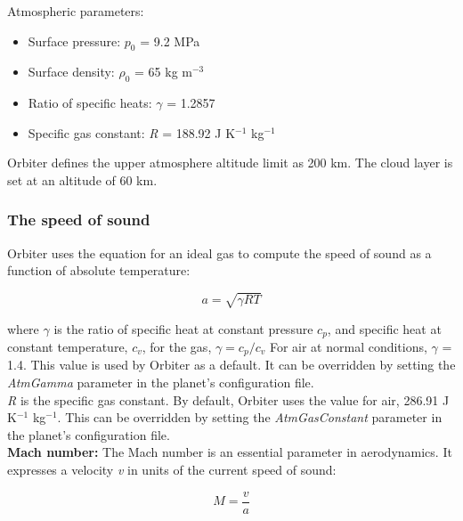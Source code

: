 \documentclass[Orbiter Developer Manual.tex]{subfiles}
\begin{document}
\noindent
Atmospheric parameters:

\begin{itemize}
\item Surface pressure: $p_{0}$ = 9.2 MPa
\item Surface density: $\rho_{0}$ = 65 kg m$^{-3}$
\item Ratio of specific heats: $\gamma$ = 1.2857
\item Specific gas constant: \textit{R} = 188.92 J K$^{-1}$ kg$^{-1}$
\end{itemize}

\noindent
Orbiter defines the upper atmosphere altitude limit as 200 km. The cloud layer is set at an altitude of 60 km.


\subsubsection{The speed of sound}
Orbiter uses the equation for an ideal gas to compute the speed of sound as a function of absolute temperature:

\[ a = \sqrt{\gamma RT} \]

\noindent
where $\gamma$ is the ratio of specific heat at constant pressure $c_{p}$, and specific heat at constant temperature, $c_{v}$, for the gas, $\gamma = c_{p} / c_{v}$ For air at normal conditions, $\gamma$ = 1.4. This value is used by Orbiter as a default. It can be overridden by setting the \textit{AtmGamma} parameter in the planet's configuration file.\\
\textit{R} is the specific gas constant. By default, Orbiter uses the value for air, 286.91 J K$^{-1}$ kg$^{-1}$. This can be overridden by setting the \textit{AtmGasConstant} parameter in the planet's configuration file.\\
\textbf{Mach number:} The Mach number is an essential parameter in aerodynamics. It expresses a velocity \textit{v} in units of the current speed of sound:

\[ M = \frac{v}{a} \]
\end{document}
